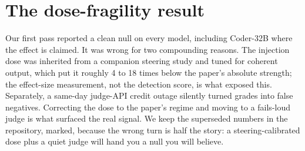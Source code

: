 \documentclass[11pt]{article}
\begin{document}
\section{The dose-fragility result}

Our first pass reported a clean null on every model, including Coder-32B where the effect is claimed. It was wrong for two compounding reasons. The injection dose was inherited from a companion steering study and tuned for coherent output, which put it roughly 4 to 18 times below the paper's absolute strength; the effect-size measurement, not the detection score, is what exposed this. Separately, a same-day judge-API credit outage silently turned grades into false negatives. Correcting the dose to the paper's regime and moving to a fails-loud judge is what surfaced the real signal. We keep the superseded numbers in the repository, marked, because the wrong turn is half the story: a steering-calibrated dose plus a quiet judge will hand you a null you will believe.
\end{document}
